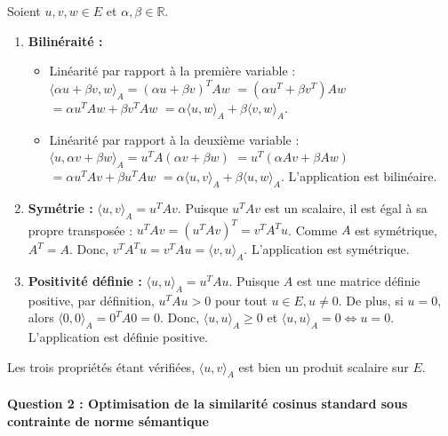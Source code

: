 \documentclass[11pt,a4paper]{report}
\begin{document}
Soient \(u, v, w \in E\) et \(\alpha, \beta \in \mathbb{R}\).

\begin{enumerate}
\def\labelenumi{\arabic{enumi}.}
\item
  \textbf{Bilinéraité :}

  \begin{itemize}

  \item
    Linéarité par rapport à la première variable :
    \(\langle \alpha u + \beta v, w \rangle_A = (\alpha u + \beta v)^T A w\)
    \(= (\alpha u^T + \beta v^T) A w\)
    \(= \alpha u^T A w + \beta v^T A w\)
    \(= \alpha \langle u, w \rangle_A + \beta \langle v, w \rangle_A\).
  \item
    Linéarité par rapport à la deuxième variable :
    \(\langle u, \alpha v + \beta w \rangle_A = u^T A (\alpha v + \beta w)\)
    \(= u^T (\alpha A v + \beta A w)\)
    \(= \alpha u^T A v + \beta u^T A w\)
    \(= \alpha \langle u, v \rangle_A + \beta \langle u, w \rangle_A\).
    L'application est bilinéaire.
  \end{itemize}
\item
  \textbf{Symétrie :} \(\langle u, v \rangle_A = u^T A v\). Puisque
  \(u^T A v\) est un scalaire, il est égal à sa propre transposée :
  \(u^T A v = (u^T A v)^T = v^T A^T u\). Comme \(A\) est symétrique,
  \(A^T = A\). Donc, \(v^T A^T u = v^T A u = \langle v, u \rangle_A\).
  L'application est symétrique.
\item
  \textbf{Positivité définie :} \(\langle u, u \rangle_A = u^T A u\).
  Puisque \(A\) est une matrice définie positive, par définition,
  \(u^T A u > 0\) pour tout \(u \in E, u \ne 0\). De plus, si \(u = 0\),
  alors \(\langle 0, 0 \rangle_A = 0^T A 0 = 0\). Donc,
  \(\langle u, u \rangle_A \ge 0\) et
  \(\langle u, u \rangle_A = 0 \iff u = 0\). L'application est définie
  positive.
\end{enumerate}

Les trois propriétés étant vérifiées, \(\langle u, v \rangle_A\) est
bien un produit scalaire sur \(E\).

\hypertarget{question-2-optimisation-de-la-similarituxe9-cosinus-standard-sous-contrainte-de-norme-suxe9mantique}{%
\paragraph{Question 2 : Optimisation de la similarité cosinus standard
sous contrainte de norme
sémantique}\label{question-2-optimisation-de-la-similarituxe9-cosinus-standard-sous-contrainte-de-norme-suxe9mantique}}
\end{document}
